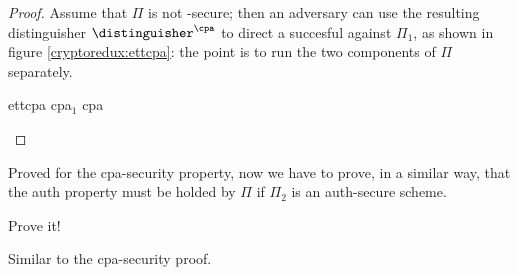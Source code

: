 \begin{proof}

    Assume that $\Pi$ is not \cpa-secure; then an adversary can use the resulting distinguisher $\distinguisher^{\cpa}$ to direct a succesful \cpa{} against $\Pi_1$, as shown in figure \ref{cryptoredux:ettcpa}: the point is to run the two components of $\Pi$ separately.

    \begin{cryptoredux}
        {ettcpa}
        {}
        {cpa$_1$}
        {cpa}


        \cseqbeginloop
        \cseqendloop

        \cseqdelay
        

        \cseqdelay

        \cseqbeginloop
        \cseqendloop

        \cseqdelay


    \end{cryptoredux}


\end{proof}

Proved for the cpa-security property, now we have to prove, in a similar way, that the auth property must be holded by $\Pi$ if $\Pi_{2}$ is an auth-secure scheme.
\begin{exercise}
    Prove it!

    Similar to the cpa-security proof.
\end{exercise}

